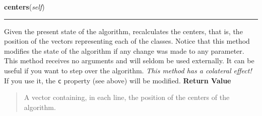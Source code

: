     \label{peach:fuzzy:cmeans:FuzzyCMeans:centers}

    \vspace{0.5ex}

\hspace{.8\funcindent}\begin{boxedminipage}{\funcwidth}

    \raggedright \textbf{centers}(\textit{self})

    \vspace{-1.5ex}

    \rule{\textwidth}{0.5\fboxrule}
\setlength{\parskip}{2ex}

Given the present state of the algorithm, recalculates the centers, that
is, the position of the vectors representing each of the classes. Notice
that this method modifies the state of the algorithm if any change was
made to any parameter. This method receives no arguments and will seldom
be used externally. It can be useful if you want to step over the
algorithm. \emph{This method has a colateral effect!} If you use it, the
\texttt{c} property (see above) will be modified.
\setlength{\parskip}{1ex}
      \textbf{Return Value}
    \vspace{-1ex}

      \begin{quote}

A vector containing, in each line, the position of the centers of the
algorithm.
      \end{quote}

    \end{boxedminipage}

    \label{peach:fuzzy:cmeans:FuzzyCMeans:membership}

    \vspace{0.5ex}

